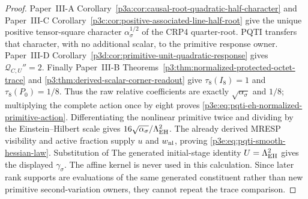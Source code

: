 \documentclass[12pt,a4paper]{article}
\begin{document}
\begin{proof}
Paper~III-A Corollary~\ref{p3a:cor:causal-root-quadratic-half-character}
and Paper~III-C Corollary~\ref{p3c:cor:positive-associated-line-half-root}
give the unique positive tensor-square character
\(\alpha_\sigma^{1/2}\) of the CRP4 quarter-root.  PQTI transfers that
character, with no additional scalar, to the primitive response owner.
Paper~III-D Corollary~\ref{p3d:cor:primitive-unit-quadratic-response} gives
\(\mathscr Q_{C,U}''=2\).  Finally
Paper~III-B Theorems~\ref{p3:thm:normalized-protected-octet-trace} and
\ref{p3:thm:derived-scalar-corner-readout} give
\(\tau_8(I_8)=1\) and \(\tau_8(P_0)=1/8\).  Thus the raw relative
coefficients are exactly \(\sqrt{\alpha_\sigma}\) and \(1/8\); multiplying
the complete action once by eight proves
\eqref{p3e:eq:pqti-eh-normalized-primitive-action}.  Differentiating the
nonlinear primitive twice and dividing by the Einstein--Hilbert scale gives
\(16\sqrt{\alpha_\sigma}/\Lambda_{\rm EH}^2\).  The already derived MRESP
visibility and active fraction supply \(u\) and \(w_{\rm nl}\), proving
\eqref{p3e:eq:pqti-smooth-hessian-law}.  Substitution of
The generated initial-stage identity
\(U=\Lambda_{\rm EH}^2\) gives the displayed \(\gamma_\sigma\).
The affine kernel is never used in this calculation.  Since later rank
supports are evaluations of the same generated constituent rather than new
primitive second-variation owners, they cannot repeat the trace comparison.
\end{proof}
\end{document}
